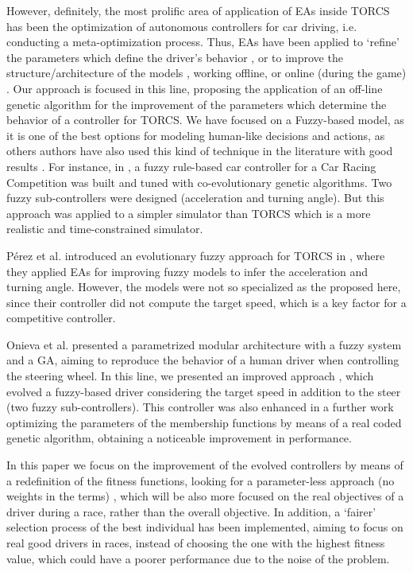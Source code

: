 \documentclass[conference]{IEEEtran}
\begin{document}
However, definitely, the most prolific area of application of EAs
inside TORCS has been the optimization of autonomous controllers for
car driving, i.e. conducting a meta-optimization process. 
Thus, EAs have been applied to `refine' the parameters which define
the driver's behavior \cite{ButzCMAES09,SAES2012}, or to improve the
structure/architecture of the models \cite{evol,neurone}, working
offline, or online (during the game)
\cite{TanOnline08,Cardamone_Online_NN}.
Our approach is focused in this line, proposing the application of an off-line genetic algorithm for the improvement of the parameters which determine the behavior of a controller for TORCS. We have focused on a Fuzzy-based model, as it is one of the best options for modeling human-like decisions and actions, as others authors have also used this kind of technique in the literature with good results \cite{torcs2012}. 
For instance, in \cite{Guadarrama2008}, a fuzzy rule-based car controller for a Car Racing Competition was built and tuned with co-evolutionary genetic algorithms. Two fuzzy sub-controllers were designed (acceleration and turning angle). But this approach was applied to a simpler simulator than TORCS which is a more realistic and time-constrained simulator. 

P{\'e}rez et al. introduced an evolutionary fuzzy approach for TORCS in \cite{PerezEvolvingFuzzy09}, where they applied EAs for improving fuzzy models to infer the acceleration and turning angle. However, the models were not so specialized as the proposed here, since their controller did not compute the target speed, which is a key factor for a competitive controller. 

Onieva et al. \cite{LFAG} presented a parametrized modular architecture with a fuzzy system and a GA, aiming to reproduce the behavior of a human driver when controlling the steering wheel. In this line, we presented an improved approach \cite{evo17}, which evolved a fuzzy-based driver considering the target speed in addition to the steer (two fuzzy sub-controllers).
This controller was also enhanced in a further work \cite{evo18} optimizing the parameters of the membership functions by means of a real coded genetic algorithm, obtaining a noticeable improvement in performance.

In this paper we focus on the improvement of the evolved controllers by means of a redefinition of the fitness functions, looking for a parameter-less approach (no weights in the terms) \cite{Harik-ParameterLess99}, which will be also more focused on the real objectives of a driver during a race, rather than the overall objective. In addition, a `fairer' selection process of the best individual has been implemented, aiming to focus on real good drivers in races, instead of choosing the one with the highest fitness value, which could have a poorer performance due to the noise of the problem.
\end{document}

